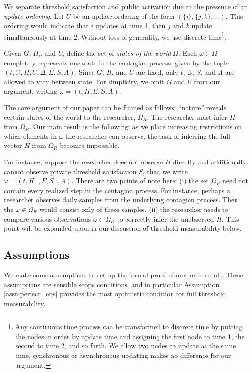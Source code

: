 \documentclass[a4paper]{article}
\begin{document}
We separate threshold satisfaction and public activation due to the presence of an \emph{update ordering}. Let $U$ be an update ordering of the form $(\{i\}, \{j, k\}, ...)$. This ordering would indicate that $i$ updates at time 1, then $j$ and $k$ update simultaneously at time 2. Without loss of generality, we use discrete time\footnote{Any continuous time process can be transformed to discrete time by putting the nodes in order by update time and assigning the first node to time 1, the second to time 2, and so forth. We allow two nodes to update at the same time, synchronous or asynchronous updating makes no difference for our argument.}.

Given $G$, $H_i$, and $U$, define the set of \emph{states of the world} $\Omega$. Each $\omega \in \Omega$ completely represents one state in the contagion process, given by the tuple $(t, G, H, U, \Delta, E, S, A)$. Since $G$, $H$, and $U$ are fixed, only $t$, $E$, $S$, and $A$ are allowed to vary between state. For simplicity, we omit $G$ and $U$ from our argument, writing $\omega = (t, H, E, S, A)$.

The core argument of our paper can be framed as follows: ``nature'' reveals certain states of the world to the researcher, $\Omega_R$. The researcher must infer $H$ from $\Omega_R$. Our main result is the following: as we place increasing restrictions on which elements in $\omega$ the researcher can observe, the task of inferring the full vector $H$ from $\Omega_R$ becomes impossible.

For instance, suppose the researcher does not observe $H$ directly and additionally cannot observe private threshold satisfaction $S$, then we write $\omega = (t, H^-, E, S^-, A)$. There are two points of note here: (i) the set $\Omega_R$ need not contain every realized step in the contagion process. For instance, perhaps a researcher observes daily samples from the underlying contagion process. Then the $\omega \in \Omega_R$ would consist only of these samples. (ii) the researcher needs to compare various observations $\omega \in \Omega_R$ to correctly infer the unobserved $H$. This point will be expanded upon in our discussion of threshold measurability below.

\subsection{Assumptions}

We make some assumptions to set up the formal proof of our main result. These assumptions are sensible scope conditions, and in particular Assumption \ref{assn:perfect_obs} provides the most optimistic condition for full threshold measurability.
\end{document}
